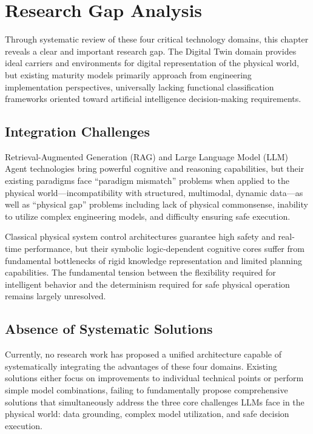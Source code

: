 \section{Research Gap Analysis}

Through systematic review of these four critical technology domains, this chapter reveals a clear and important research gap. The Digital Twin domain provides ideal carriers and environments for digital representation of the physical world, but existing maturity models primarily approach from engineering implementation perspectives, universally lacking functional classification frameworks oriented toward artificial intelligence decision-making requirements.

\subsection{Integration Challenges}

Retrieval-Augmented Generation (RAG) and Large Language Model (LLM) Agent technologies bring powerful cognitive and reasoning capabilities, but their existing paradigms face ``paradigm mismatch'' problems when applied to the physical world—incompatibility with structured, multimodal, dynamic data—as well as ``physical gap'' problems including lack of physical commonsense, inability to utilize complex engineering models, and difficulty ensuring safe execution.

Classical physical system control architectures guarantee high safety and real-time performance, but their symbolic logic-dependent cognitive cores suffer from fundamental bottlenecks of rigid knowledge representation and limited planning capabilities. The fundamental tension between the flexibility required for intelligent behavior and the determinism required for safe physical operation remains largely unresolved.

\subsection{Absence of Systematic Solutions}

Currently, no research work has proposed a unified architecture capable of systematically integrating the advantages of these four domains. Existing solutions either focus on improvements to individual technical points or perform simple model combinations, failing to fundamentally propose comprehensive solutions that simultaneously address the three core challenges LLMs face in the physical world: data grounding, complex model utilization, and safe decision execution.


